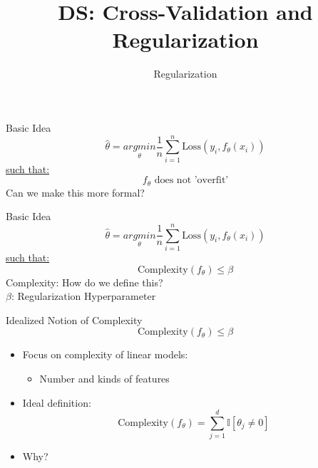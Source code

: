 \documentclass[aspectratio=169]{../latex_main/tntbeamer}  %
\title[Introduction]{DS: Cross-Validation and Regularization}
\subtitle{Regularization}
\begin{document}
	
	\maketitle
	\begin{frame}{Basic Idea}
	    \begin{equation*}
	        \hat{\theta} = \underset{\theta}{arg min} \frac{1}{n}\sum\limits_{i=1}^n\text{Loss}(y_i,f_\theta(x_i))
	    \end{equation*}
	    \underline{such that:}
	    \begin{equation*}
	        f_\theta \text{ does not 'overfit'}
	    \end{equation*}
	    Can we make this more formal?
	\end{frame}
	
	
	\begin{frame}[c]{Basic Idea}
	    \begin{equation*}
	        \hat{\theta} = \underset{\theta}{arg min} \frac{1}{n}\sum\limits_{i=1}^n\text{Loss}(y_i,f_\theta(x_i))
	    \end{equation*}
	    \underline{such that:}
	    \begin{equation*}
	         \text{Complexity}(f_\theta) \leq \beta
	    \end{equation*}
	    Complexity: How do we define this?\\
	    $\beta$:  Regularization Hyperparameter

	\end{frame}
	
	
	\begin{frame}[c]{Idealized Notion of Complexity}
	   \begin{equation*}
	         \text{Complexity}(f_\theta) \leq \beta
	    \end{equation*}
        \begin{itemize}
            \item Focus on complexity of linear models:
            \begin{itemize}
                \item Number and kinds of features
            \end{itemize}
            \item Ideal definition:
            \begin{equation*}
                \text{Complexity}(f_\theta) = \sum\limits_{j=1}^d\mathbb{I}[\theta_j \neq 0] 
            \end{equation*}
            \item Why?
        \end{itemize}
	\end{frame}
	
\end{document}

